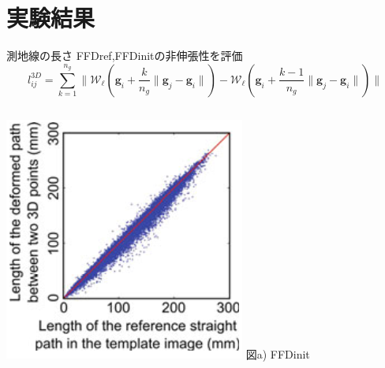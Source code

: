 \documentclass[dvipdfmx]{beamer}
\begin{document}
  \section{実験結果}
  \begin{frame}{測地線の長さ}
      FFDref,FFDinitの非伸張性を評価
    \begin{equation}
        l_{ij}^{3D} = \sum_{k=1}^{n_g} \| \mathcal{W}_{\bm{\ell}}(\bm{g}_i + \frac{k}{n_g}\|\bm{g}_j - \bm{g}_i\|) -  \mathcal{W}_{\bm{\ell}}(\bm{g}_i + \frac{k-1}{n_g}\|\bm{g}_j - \bm{g}_i\|)\|
    \end{equation}
     \begin{block}{}
         \centering
        \begin{columns}[onlytextwidth]
            \begin{column}[T]{0.32\textwidth} %
                \centering
                \includegraphics[width=1.0\linewidth]{img/fig4a.png}
                図a) FFDinit
            \end{column}
            \begin{column}[T]{0.32\textwidth} %
                \centering

\end{column}
\end{columns}
\end{block}
\end{frame}
\end{document}
